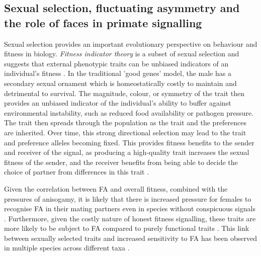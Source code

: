\subsection{Sexual selection, fluctuating asymmetry and the role of faces in primate signalling}
Sexual selection provides an important evolutionary perspective on behaviour and fitness in biology. \textit{Fitness indicator theory }is a subset of sexual selection and suggests that external phenotypic traits can be unbiased indicators of an individual's fitness \citep{Zahavi.1975}. In the traditional 'good genes' model, the male has a secondary sexual ornament which is homeostatically costly to maintain and detrimental to survival. The magnitude, colour, or symmetry of the trait then provides an unbiased indicator of the individual's ability to buffer against environmental instability, such as reduced food availability or pathogen pressure. The trait then spreads through the population as the trait and the preferences are inherited. Over time, this strong directional selection may lead to the trait and preference alleles becoming fixed. This provides fitness benefits to the sender and receiver of the signal, as producing a high-quality trait increases the sexual fitness of the sender, and the receiver benefits from being able to decide the choice of partner from differences in this trait \citep{Zahavi.1977}.

Given the correlation between FA and overall fitness, combined with the pressures of anisogamy, it is likely that there is increased pressure for females to recognise FA in their mating partners even in species without conspicuous signals \citep{Palmer.1986}. Furthermore, given the costly nature of honest fitness signalling, these traits are more likely to be subject to FA compared to purely functional traits \citep{Beasley.2013, Vijendravarma.2022}. This link between sexually selected traits and increased sensitivity to FA has been observed in multiple species across different taxa \citep{Thornhill.2006, Little.2008, Little.2012, Beasley.2013}. 

